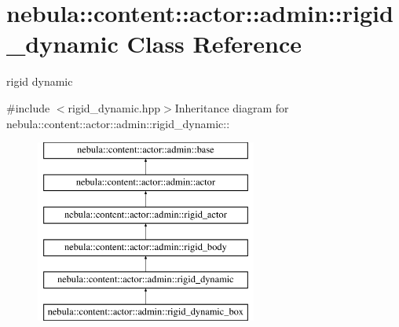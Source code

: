 \hypertarget{classnebula_1_1content_1_1actor_1_1admin_1_1rigid__dynamic}{
\section{nebula::content::actor::admin::rigid\_\-dynamic Class Reference}
\label{classnebula_1_1content_1_1actor_1_1admin_1_1rigid__dynamic}
}


rigid dynamic  


{\ttfamily \#include $<$rigid\_\-dynamic.hpp$>$}Inheritance diagram for nebula::content::actor::admin::rigid\_\-dynamic::\begin{figure}[H]
\begin{center}
\leavevmode
\includegraphics[height=6cm]{classnebula_1_1content_1_1actor_1_1admin_1_1rigid__dynamic}
\end{center}
\end{figure}
